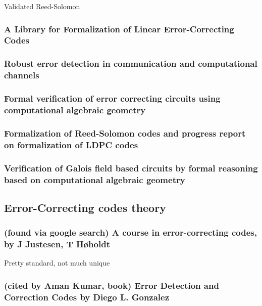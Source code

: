 \documentclass{article}
\begin{document}
Validated Reed-Solomon

\subsubsection{A Library for Formalization of Linear Error-Correcting Codes}

\subsubsection{Robust error detection in communication and computational channels}

\subsubsection{Formal verification of error correcting circuits using computational algebraic geometry}

\subsubsection{Formalization of Reed-Solomon codes and progress report on formalization of LDPC codes}

\subsubsection{Verification of Galois field based circuits by formal reasoning based on computational algebraic geometry}


\subsection{Error-Correcting codes theory}

\subsubsection{(found via google search) A course in error-correcting codes, by J Justesen, T Høholdt }

Pretty standard, not much unique

\subsubsection{(cited by Aman Kumar, book) Error Detection and Correction Codes by Diego L. Gonzalez}
\end{document}

